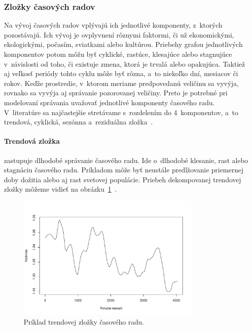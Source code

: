 \documentclass[a4paper,twoside,slovak,12pt,appendix]{article}
\begin{document}

\subsubsection{Zložky časových radov}
Na vývoj časových radov vplývajú ich jednotlivé komponenty, z~ktorých
pozostávajú. Ich vývoj je ovplyvnení rôznymi faktormi, či už ekonomickými,
ekologickými, počasím, sviatkami alebo kultúrou. Priebehy grafou jednotlivých
komponentov potom môžu byť cyklické, rastúce, klesajúce alebo stagnujúce
v~závislosti od toho, či existuje zmena, ktorá je trvalá alebo opakujúca.
Taktiež aj veľkosť periódy tohto cyklu môže byť rôzna, a~to niekoľko dní,
mesiacov či rokov. Keďže prostredie, v~ktorom meriame predpovedanú veličinu sa
vyvýja, rovnako sa vyvýja aj správanie pozorovanej veličiny. Preto je potrebné
pri modelovaní správania uvažovať jednotlivé komponenty časového radu.
V~literatúre sa najčastejšie stretávame s~rozdelením do 4~komponentov, a~to
trendová, cyklická, sezónna a~reziduálna zložka~\cite{Grmanova2016}.

\paragraph{Trendová zložka} zastupuje dlhodobé správanie časového radu. Ide
o~dlhodobé klesanie, rast alebo stagnáciu časového radu. Príkladom môže byť
neustále predlžovanie priemernej doby dožitia alebo aj rast svetovej populácie.
Priebeh dekompovanej trendovej zložky môžeme vidieť na
obrázku~\ref{fig:trend-component}~\cite{Agrawal2013}.

\begin{figure}[H]
  \centering
  \includegraphics[width=0.8\textwidth]{trend_component.pdf}
  \caption{Príklad trendovej zložky časového radu.}
  \label{fig:trend-component}
\end{figure}
\end{document}
